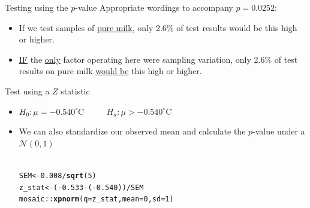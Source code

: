 \documentclass[handout]{beamer}\usepackage[]{graphicx}\usepackage[]{color}
\newcommand{\hlnum}[1]{\textcolor[rgb]{0.686,0.059,0.569}{#1}}%
\newcommand{\hlopt}[1]{\textcolor[rgb]{0,0,0}{#1}}%
\newcommand{\hlstd}[1]{\textcolor[rgb]{0.345,0.345,0.345}{#1}}%
\newcommand{\hlkwb}[1]{\textcolor[rgb]{0.69,0.353,0.396}{#1}}%
\newcommand{\hlkwc}[1]{\textcolor[rgb]{0.333,0.667,0.333}{#1}}%
\newcommand{\hlkwd}[1]{\textcolor[rgb]{0.737,0.353,0.396}{\textbf{#1}}}%
\newenvironment{knitrout}{}{} %
\begin{document}
\begin{frame}[fragile]{Testing using the $p$-value}
Appropriate wordings to accompany $p=0.0252$:
\begin{itemize}
	\setlength\itemsep{1.5em}
	\item If we test samples of \underline{pure milk}, only 2.6\% of test results would be this high or higher.
	\pause 
	\item \underline{IF} the \underline{only} factor operating here were sampling variation, only  2.6\% of test results on pure milk  \underline{would be} this high or higher.
\end{itemize}

\end{frame}

\begin{frame}[fragile]{Test using a $Z$ statistic}
\begin{itemize}
	\setlength\itemsep{.7em}
	\item   $H_0: \mu =  -0.540^{\circ}$C $\qquad$  $H_a: \mu >  -0.540^{\circ}$C
	
	\item We can also standardize our observed mean and calculate the $p$-value under a $\mathcal{N}(0,1)$ \\ \ \\

\begin{knitrout}\scriptsize
{}\color{fgcolor}
\begin{alltt}
\hlstd{SEM} \hlkwb{<-} \hlnum{0.008}\hlopt{/}\hlkwd{sqrt}\hlstd{(}\hlnum{5}\hlstd{)}
\hlstd{z_stat} \hlkwb{<-} \hlstd{(}\hlopt{-}\hlnum{0.533} \hlopt{-} \hlstd{(}\hlopt{-}\hlnum{0.540}\hlstd{))} \hlopt{/} \hlstd{SEM}
\hlstd{mosaic}\hlopt{::}\hlkwd{xpnorm}\hlstd{(}\hlkwc{q} \hlstd{= z_stat,} \hlkwc{mean} \hlstd{=} \hlnum{0}\hlstd{,} \hlkwc{sd} \hlstd{=} \hlnum{1}\hlstd{)}
\end{alltt}


{\ttfamily\noindent\itshape\color{messagecolor}{\#\# }}

{\ttfamily\noindent\itshape{}}

{\ttfamily\noindent\itshape\color{messagecolor}{\#\# 	P(X <= 1.957) = P(Z <= 1.957) = 0.9748}}

{\ttfamily\noindent\itshape\color{messagecolor}{\#\# 	P(X >\ \ 1.957) = P(Z >\ \ 1.957) = 0.0252}}

{\ttfamily\noindent\itshape\color{messagecolor}{\#\# }}


\end{knitrout}
\end{itemize}
\end{frame}
\end{document}
